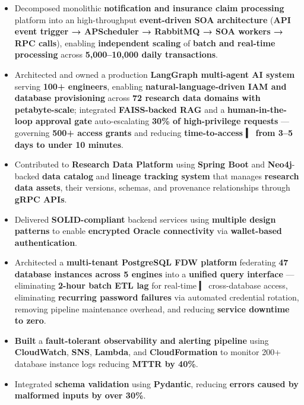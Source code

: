 \documentclass[11 pt]{article}
\begin{document}
\begin{itemize}

\item Decomposed monolithic \textbf{notification and insurance claim processing} platform into an high-throughput \textbf{event-driven SOA architecture} (\textbf{API event trigger → APScheduler → RabbitMQ → SOA workers → RPC calls}),
  enabling \textbf{independent scaling} of \textbf{batch and real-time processing} across \textbf{5,000--10,000 daily transactions}.

  \item  Architected and owned a production \textbf{LangGraph multi-agent AI system} serving \textbf{100+ engineers}, enabling \textbf{natural-language-driven IAM and database provisioning} across \textbf{72 research data domains with petabyte-scale}; integrated \textbf{FAISS-backed RAG} and a \textbf{human-in-the-loop approval gate} auto-escalating \textbf{30\% of high-privilege requests} --- governing \textbf{500+ access grants} and reducing \textbf{time-to-access
  ▎ from 3--5 days to under 10 minutes}.

  \item Contributed to \textbf{Research Data Platform} using \textbf{Spring Boot} and \textbf{Neo4j}-backed \textbf{data catalog} and \textbf{lineage tracking system} that manages \textbf{research data assets}, their versions,
  schemas, and provenance relationships through \textbf{gRPC APIs}.

  \item Delivered \textbf{SOLID-compliant} backend services using \textbf{ multiple design patterns} to enable \textbf{encrypted Oracle connectivity} via \textbf{wallet-based authentication}.

\item Architected a \textbf{multi-tenant PostgreSQL FDW platform} federating \textbf{47 database instances across 5 engines} into a \textbf{unified query interface} --- eliminating \textbf{2-hour batch ETL lag} for real-time
  ▎ cross-database access, eliminating \textbf{recurring password failures} via automated credential rotation, removing pipeline maintenance overhead, and reducing \textbf{service downtime to zero}.

  \item \textbf{Built} a \textbf{fault-tolerant observability and alerting pipeline} using \textbf{CloudWatch}, \textbf{SNS}, \textbf{Lambda}, and \textbf{CloudFormation} to monitor 200+ database instance logs reducing \textbf{MTTR by 40\%}.

  \item Integrated \textbf{schema validation} using \textbf{Pydantic}, reducing \textbf{errors caused by malformed inputs by over 30\%}.

\end{itemize}
\end{document}
